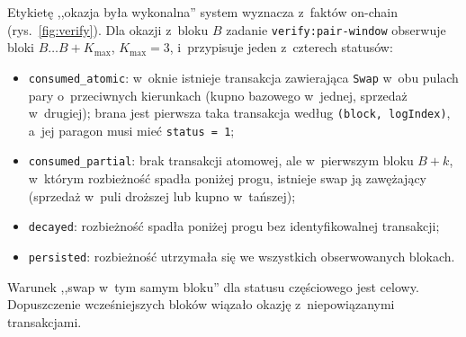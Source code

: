 Etykietę ,,okazja była wykonalna'' system wyznacza z~faktów on-chain (rys.~\ref{fig:verify}). Dla
okazji z~bloku $B$ zadanie \texttt{verify:pair-window} obserwuje bloki $B\ldots B+K_{\max}$,
$K_{\max}=3$, i~przypisuje jeden z~czterech statusów:
\begin{itemize}[nosep]
  \item \texttt{consumed\_atomic}: w~oknie istnieje transakcja zawierająca \texttt{Swap} w~obu
        pulach pary o~przeciwnych kierunkach (kupno bazowego w~jednej, sprzedaż w~drugiej); brana
        jest pierwsza taka transakcja według \texttt{(block, logIndex)}, a~jej paragon musi mieć
        \texttt{status = 1};
  \item \texttt{consumed\_partial}: brak transakcji atomowej, ale w~pierwszym bloku $B+k$,
        w~którym rozbieżność spadła poniżej progu, istnieje swap ją zawężający (sprzedaż w~puli
        droższej lub kupno w~tańszej);
  \item \texttt{decayed}: rozbieżność spadła poniżej progu bez identyfikowalnej transakcji;
  \item \texttt{persisted}: rozbieżność utrzymała się we wszystkich obserwowanych blokach.
\end{itemize}
Warunek ,,swap w~tym samym bloku'' dla statusu częściowego jest celowy. Dopuszczenie
wcześniejszych bloków wiązało okazję z~niepowiązanymi transakcjami.

